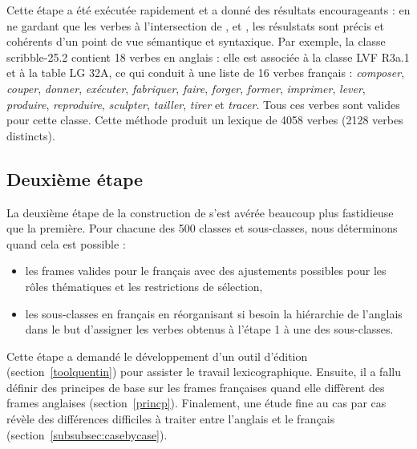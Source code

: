 Cette étape a été exécutée rapidement et a donné des résultats encourageants :
en ne gardant que les verbes à l'intersection de \Ltrad{}, \Clvf{} et \Clg{},
les résulstats sont précis et cohérents d'un point de vue sémantique et
syntaxique. Par exemple, la classe {\color{blue}scribble-25.2} contient 18
verbes en anglais : elle est associée à la classe LVF {\color{red}R3a.1} et à
la table LG {\color{green}32A}, ce qui conduit à une liste de 16 verbes
français : \emph{composer}, \emph{couper}, \emph{donner}, \emph{exécuter},
\emph{fabriquer}, \emph{faire}, \emph{forger}, \emph{former}, \emph{imprimer},
\emph{lever}, \emph{produire}, \emph{reproduire}, \emph{sculpter},
\emph{tailler}, \emph{tirer} et \emph{tracer}. Tous ces verbes sont valides
pour cette classe.  Cette méthode produit un lexique de 4058 verbes (2128
verbes distincts).



\subsection{Deuxième étape}\label{second}

La deuxième étape de la construction de \verbenet{} s'est avérée beaucoup plus
fastidieuse que la première. Pour chacune des 500 classes et sous-classes, nous
déterminons quand cela est possible :

\begin{itemize}

    \item les frames valides pour le français avec des ajustements possibles
        pour les rôles thématiques et les restrictions de sélection,

    \item les sous-classes en français en réorganisant si besoin la hiérarchie
        de l'anglais dans le but d'assigner les verbes obtenus à l'étape 1 à
        une des sous-classes.

\end{itemize}

Cette étape a demandé le développement d'un outil d'édition
(section~\ref{toolquentin}) pour assister le travail lexicographique. Ensuite,
il a fallu définir des principes de base sur les frames françaises quand elle
diffèrent des frames anglaises (section~\ref{princp}). Finalement, une étude
fine au cas par cas révèle des différences difficiles à traiter entre l'anglais
et le français (section~\ref{subsubsec:casebycase}).

